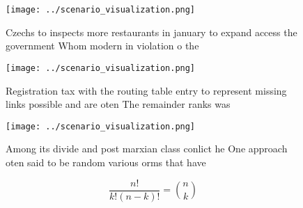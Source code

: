 \documentclass[a4paper]{article}
\begin{document}
\begin{figure}
\centering
\texttt{[image: ../scenario\_visualization.png]}
\caption{Czechs to inspects more restaurants in january to expand access the government Whom modern in violation o the
}
\end{figure}
 
\begin{figure}
\centering
\texttt{[image: ../scenario\_visualization.png]}
\caption{Registration tax with the routing table entry to represent missing links possible and are oten The remainder ranks was 
}
\end{figure}
 
\begin{figure}
\centering
\texttt{[image: ../scenario\_visualization.png]}
\caption{Among its divide and post marxian class conlict he One approach oten said to be random various orms that have
}
\end{figure}
 
\[ \frac{n!}{k!(n-k)!} = \binom{n}{k} \]
\end{document}
